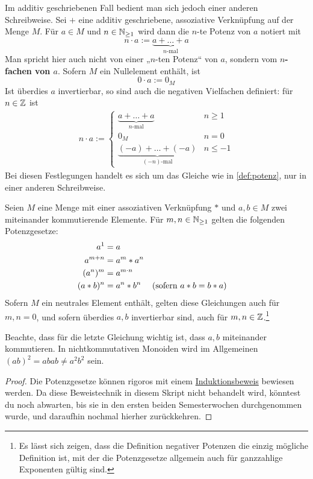     
\begin{nota}[*]
    Im additiv geschriebenen Fall bedient man sich jedoch einer anderen Schreibweise. Sei $+$ eine additiv geschriebene, assoziative Verknüpfung auf der Menge $M$. Für $a\in M$ und $n\in \mathbb N_{\ge 1}$ wird dann die $n$-te Potenz von $a$ notiert mit
        \[ n \cdot a := \underbrace{a + \ldots + a}_{n\text{-mal}} \]
    Man spricht hier auch nicht von einer „$n$-ten Potenz“ von $a$, sondern vom \textbf{$n$-fachen von $a$}. Sofern $M$ ein Nullelement enthält, ist
        \[ 0\cdot a := 0_M \]
    Ist überdies $a$ invertierbar, so sind auch die negativen Vielfachen definiert: für $n\in \mathbb Z$ ist
    \begin{align*}
        n \cdot a := \begin{cases}
            \underbrace{a+ \ldots + a}_{n\text{-mal}} & n \ge 1 \\
            0_M & n= 0 \\
            \underbrace{(-a) + \ldots +  (-a)}_{(-n)\text{-mal}} & n \le -1
        \end{cases}
    \end{align*}
    Bei diesen Festlegungen handelt es sich um das Gleiche wie in \cref{def:potenz}, nur in einer anderen Schreibweise.
\end{nota}


\begin{satz}[* Potenzgesetze] \label{potenzgesetze}
    Seien $M$ eine Menge mit einer assoziativen Verknüpfung $*$ und $a,b\in M$ zwei miteinander kommutierende Elemente. Für $m,n\in \mathbb N_{\ge 1}$ gelten die folgenden Potenzgesetze:
    \begin{align*}
        a^1 & = a \\
        a^{m+n} & = a^m* a^n \\
        (a^n)^m & = a^{m\cdot n} \\
        (a*b)^n &= a^n*b^n && (\textnormal{sofern $a*b=b*a$})
    \end{align*}
    Sofern $M$ ein neutrales Element enthält, gelten diese Gleichungen auch für $m,n=0$, und sofern überdies $a,b$ invertierbar sind, auch für $m,n\in \mathbb Z$.\footnote{Es lässt sich zeigen, dass die Definition negativer Potenzen die einzig mögliche Definition ist, mit der die Potenzgesetze allgemein auch für ganzzahlige Exponenten gültig sind.}
\end{satz}
\noindent Beachte, dass für die letzte Gleichung wichtig ist, dass $a,b$ miteinander kommutieren. In nichtkommutativen Monoiden wird im Allgemeinen $(ab)^2=abab\neq a^2b^2$ sein.
\begin{proof}
    Die Potenzgesetze können rigoros mit einem \href{https://de.wikipedia.org/wiki/Vollst\%C3\%A4ndige_Induktion}{Induktionsbeweis} bewiesen werden. Da diese Beweistechnik in diesem Skript nicht behandelt wird, könntest du noch abwarten, bis sie in den ersten beiden Semesterwochen durchgenommen wurde, und daraufhin nochmal hierher zurückkehren.
\end{proof}



